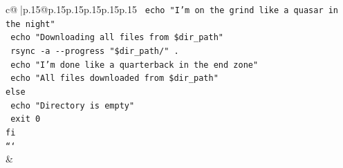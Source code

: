 \documentclass{article}
\begin{document}
{\begin{supertabular}{c@{$\;$}|p{.15\linewidth}@{}p{.15\linewidth}p{.15\linewidth}p{.15\linewidth}p{.15\linewidth}p{.15\linewidth}}
{{{\texttt{  echo "I'm on the grind like a quasar in the night"} \\
\texttt{  echo "Downloading all files from \$dir\_path"} \\
\texttt{  rsync {-}a {-}{-}progress "\$dir\_path/" .} \\
\texttt{  echo "I'm done like a quarterback in the end zone"} \\
\texttt{  echo "All files downloaded from \$dir\_path"} \\
\texttt{else} \\
\texttt{  echo "Directory is empty"} \\
\texttt{  exit 0} \\
\texttt{fi} \\
\texttt{```} \\
            }
        }
    }
    & \\ \\

\end{supertabular}
}
\end{document}
